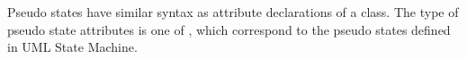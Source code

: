 \begin{comment}
	\item \ttt{initial\_state}: A state is defined as an initial state, which has an incoming transition outgoing from a pseudo initial state within the same region or composite state. 
	
	\item \ttt{effName}: For initial state, this is the transition effect associated with the initial transition.
	
	\item \ttt{concurrent state}: The representation of a concurrent state. 
	The latter is composed of a set of regions.
	Each region contains a set of vertices, which for each is either a state or a pseudo state.
	
\end{itemize}
\end{comment}



Pseudo states have similar syntax as attribute declarations of a class.
The type of pseudo state attributes is one of , which correspond to the pseudo states defined in UML State Machine. 

